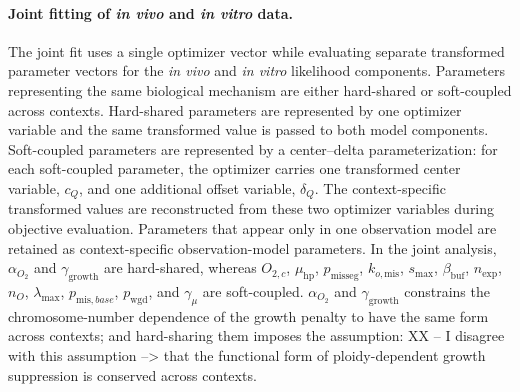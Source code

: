 \documentclass[11pt]{article}
\begin{document}
\paragraph{Joint fitting of \textit{in vivo} and \textit{in vitro} data.}
The joint fit uses a single optimizer vector while evaluating separate transformed parameter vectors for the \textit{in vivo} and \textit{in vitro} likelihood components. Parameters representing the same biological mechanism are either hard-shared or soft-coupled across contexts. Hard-shared parameters are represented by one optimizer variable and the same transformed value is passed to both model components. Soft-coupled parameters are represented by a center--delta parameterization: for each soft-coupled parameter, the optimizer carries one transformed center variable, $c_Q$, and one additional offset variable, $\delta_Q$. The context-specific transformed values are reconstructed from these two optimizer variables during objective evaluation.
Parameters that appear only in one observation model are retained as context-specific observation-model parameters. In the joint analysis, $\alpha_{O_2}$ and $\gamma_{\mathrm{growth}}$ are hard-shared, whereas $O_{2,c}$, $\mu_{\mathrm{hp}}$, $p_{\mathrm{misseg}}$, $k_{o,\mathrm{mis}}$, $s_{\max}$, $\beta_{\mathrm{buf}}$, $n_{\mathrm{exp}}$, $n_O$, $\lambda_{\max}$, $p_{\mathrm{mis},base}$, $p_{\mathrm{wgd}}$, and $\gamma_\mu$ are soft-coupled. $\alpha_{O_2}$ and $\gamma_{\mathrm{growth}}$ constrains the chromosome-number dependence of the growth penalty to have the same form across contexts; and hard-sharing them imposes the assumption: XX -- I disagree with this assumption --> that the functional form of ploidy-dependent growth suppression is conserved across contexts.
\end{document}
